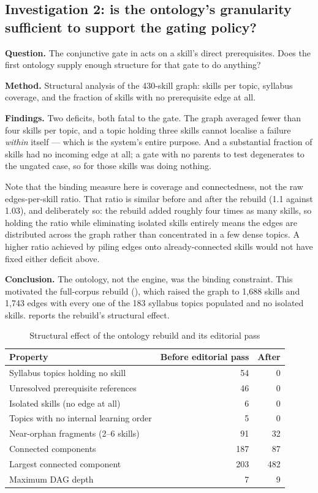 \subsection{Investigation 2: is the ontology's granularity sufficient to support the gating policy?}

\textbf{Question.} The conjunctive gate in  acts on a skill's
direct prerequisites. Does the first ontology supply enough structure for that
gate to do anything?

\textbf{Method.} Structural analysis of the 430-skill graph: skills per topic,
syllabus coverage, and the fraction of skills with no prerequisite edge at all.

\textbf{Findings.} Two deficits, both fatal to the gate. The graph averaged
fewer than four skills per topic, and a topic holding three skills cannot
localise a failure \emph{within} itself --- which is the system's entire
purpose. And a substantial fraction of skills had no incoming edge at all; a
gate with no parents to test degenerates to the ungated case, so for those
skills  was doing nothing.

Note that the binding measure here is coverage and connectedness, not the raw
edges-per-skill ratio. That ratio is similar before and after the rebuild
(1.1 against 1.03), and deliberately so: the rebuild added roughly four times
as many skills, so holding the ratio while eliminating isolated skills entirely
means the edges are distributed across the graph rather than concentrated in a
few dense topics. A higher ratio achieved by piling edges onto already-connected
skills would not have fixed either deficit above.

\textbf{Conclusion.} The ontology, not the engine, was the binding constraint.
This motivated the full-corpus rebuild (), which
raised the graph to 1{,}688 skills and 1{,}743 edges with every one of the 183
syllabus topics populated and no isolated skills. 
reports the rebuild's structural effect.

\begin{table}[htbp]
  \centering
  \caption{Structural effect of the ontology rebuild and its editorial pass}
  \label{tab:ontology-effects}
  \begin{tabular}{lrr}
    \toprule
    Property & Before editorial pass & After \\
    \midrule
    Syllabus topics holding no skill & 54 & 0 \\
    Unresolved prerequisite references & 46 & 0 \\
    Isolated skills (no edge at all) & 6 & 0 \\
    Topics with no internal learning order & 5 & 0 \\
    Near-orphan fragments (2--6 skills) & 91 & 32 \\
    Connected components & 187 & 87 \\
    Largest connected component & 203 & 482 \\
    Maximum DAG depth & 7 & 9 \\
    \bottomrule
  \end{tabular}
\end{table}

